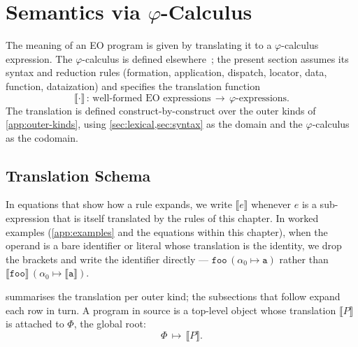 
\section{Semantics via \texorpdfstring{\(\varphi\)-Calculus}{phi-Calculus}}\label{sec:semantics}

The meaning of an EO program is given by translating it to a
  \(\varphi\)-calculus expression.
The \(\varphi\)-calculus is defined elsewhere~\citep{bugayenko2021eolang};
  the present section assumes its syntax and reduction rules
  (formation, application, dispatch, locator, data, function, dataization)
  and specifies the translation function
\begin{equation*}
  \llbracket \cdot \rrbracket\,:\,
    \text{well-formed EO expressions}\,\longrightarrow\,
    \varphi\text{-expressions}.
\end{equation*}
The translation is defined construct-by-construct over the outer kinds of
  \cref{app:outer-kinds}, using \cref{sec:lexical,sec:syntax} as the
  domain and the \(\varphi\)-calculus as the codomain.

\subsection{Translation Schema}\label{sec:sem:schema}

In equations that show how a rule expands, we write $\llbracket e \rrbracket$
  whenever $e$ is a sub-expression that is itself translated by the
  rules of this chapter.
In worked examples (\cref{app:examples} and the equations within this
  chapter), when the operand is a bare identifier or literal whose
  translation is the identity, we drop the brackets and write the
  identifier directly --- $\mathtt{foo}\,(\alpha_0 \mapsto \mathtt{a})$
  rather than $\llbracket \mathtt{foo} \rrbracket\,(\alpha_0 \mapsto
  \llbracket \mathtt{a} \rrbracket)$.

 summarises the translation per outer kind;
  the subsections that follow expand each row in turn.
A program in source is a top-level object whose translation
  \(\llbracket P \rrbracket\) is attached to \(\Phi\), the global root:
\begin{equation*}
  \Phi\,\mapsto\,\llbracket P \rrbracket.
\end{equation*}

